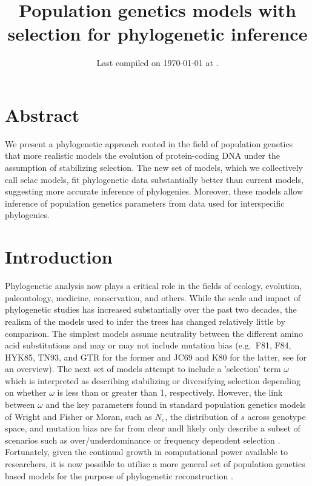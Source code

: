\documentclass{article}
\title{Population genetics models with selection for phylogenetic
inference} \date{Last compiled on \today\xspace at \currenttime.}
\newcommand{\Ne}{\ensuremath{{N_e}}\xspace} %
\begin{document}
\maketitle


\section*{Abstract}
We present a phylogenetic approach rooted in the field of population genetics that more realistic models the evolution of protein-coding DNA under the assumption of stabilizing selection.
The new set of models, which we collectively call selac models, fit phylogenetic data substantially better than current models, suggesting more accurate inference of phylogenies.
Moreover, these models allow inference of population genetics parameters from data used for interspecific phylogenies.

\section*{Introduction}
Phylogenetic analysis now plays a critical role in the fields of ecology, evolution, paleontology, medicine, conservation, and others.
While the scale and impact of phylogenetic studies has increased substantially over the past two decades, the realism of the models used to infer the trees has changed relatively little by comparison.
The simplest models assume neutrality between the different amino acid substitutions and may or may not include mutation bias (e.g.~F81, F84, HYK85, TN93, and GTR for the former and JC69 and K80 for the latter, see \citet{Yang2014} for an overview).
The next set of models attempt to include a 'selection' term $\omega$ which is interpreted as describing stabilizing or diversifying selection depending on whether $\omega$ is less than or greater than 1, respectively. 
However, the link between $\omega$ and the key parameters found in standard population genetics models of Wright and Fisher or Moran, such as \Ne, the distribution of $s$ across genotype space, and mutation bias are far from clear andl likely only describe a subset of scenarios such as over/underdominance or frequency dependent selection  \citep{HughesAndNei1988}.
Fortunately, given the continual growth in computational power available to researchers, it is now possible to utilize a more general set of population genetics based models for the purpose of phylogenetic reconstruction \citep[e.g.][]{HalpernAndBruno1998,RobinsonEtAl2003,LartillotAndPhilippe2004,RodrigueAndLartillot2014}.
\end{document}
